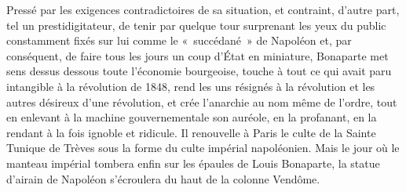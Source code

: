 \documentclass[french,twoside]{book} %
\newif\ifdev
\renewcommand{\LettrineFontHook}{\color{rubric}}
\newcommand{\initialiv}[2]{%
  \let\oldLFH\LettrineFontHook
  \IfSubStr{QJ’}{#1}{
    \lettrine[lines=4, lhang=0.2, loversize=-0.1, lraise=0.2]{\smash{#1}}{#2}
  }{\IfSubStr{É}{#1}{
    \lettrine[lines=4, lhang=0.2, loversize=-0, lraise=0]{\smash{#1}}{#2}
  }{\IfSubStr{ÀÂ}{#1}{
    \lettrine[lines=4, lhang=0.2, loversize=-0, lraise=0, slope=0.6em]{\smash{#1}}{#2}
  }{\IfSubStr{A}{#1}{
    \lettrine[lines=4, lhang=0.2, loversize=0.2, slope=0.6em]{\smash{#1}}{#2}
  }{\IfSubStr{V}{#1}{
    \lettrine[lines=4, lhang=0.2, loversize=0.2, slope=-0.5em]{\smash{#1}}{#2}
  }{
    \lettrine[lines=4, lhang=0.2, loversize=0.2]{\smash{#1}}{#2}
  }}}}}
  \let\LettrineFontHook\oldLFH
}
\newcommand\chapterclose{} %
\renewcommand{\LettrineFontHook}{\bfseries\color{rubric}}
\begin{document}
Pressé par les exigences contradictoires de sa situation, et contraint, d’autre part, tel un prestidigitateur, de tenir par quelque tour surprenant les yeux du public constamment fixés sur lui comme le « succédané » de Napoléon et, par conséquent, de faire tous les jours un coup d’État en miniature, Bonaparte met sens dessus dessous toute l’économie bourgeoise, touche à tout ce qui avait paru intangible à la révolution de 1848, rend les uns résignés à la révolution et les autres désireux d’une révolution, et crée l’anarchie au nom même de l’ordre, tout en enlevant à la machine gouvernementale son auréole, en la profanant, en la rendant à la fois ignoble et ridicule. Il renouvelle à Paris le culte de la Sainte Tunique de Trèves sous la forme du culte impérial napoléonien. Mais le jour où le manteau impérial tombera enfin sur les épaules de Louis Bonaparte, la statue d’airain de Napoléon s’écroulera du haut de la colonne Vendôme.
\chapterclose

 


\ifbooklet
  \newpage\null\thispagestyle{empty}\newpage
\fi

\ifdev %
\fontname\font — \textsc{Les règles du jeu}\par
(\hyperref[utopie]{\underline{Lien}})\par
\noindent \initialiv{A}{lors là}\blindtext\par
\noindent \initialiv{À}{ la bonheur des dames}\blindtext\par
\noindent \initialiv{É}{tonnez-le}\blindtext\par
\noindent \initialiv{Q}{ualitativement}\blindtext\par
\noindent \initialiv{V}{aloriser}\blindtext\par
\Blindtext
\phantomsection
\label{utopie}
\Blinddocument
\fi
\end{document}
